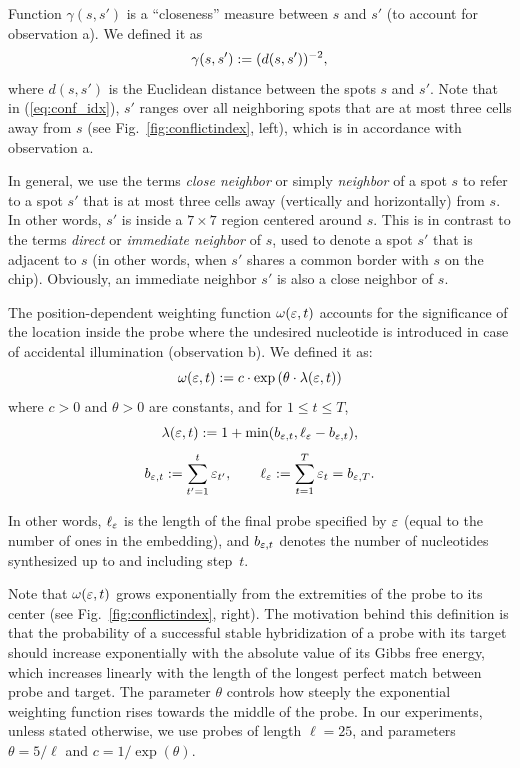 Function $\gamma(s,s')$ is a ``closeness'' measure between $s$ and $s'$ (to
account for observation a). We defined it as
\begin{equation}\label{eq:dist_weight}
\gamma(s,s') := (d(s,s'))^{-2},\nopagebreak
\end{equation}\nopagebreak
where $d(s,s')$ is the Euclidean distance between the spots $s$ and $s'$. Note
that in (\ref{eq:conf_idx}), $s'$ ranges over all neighboring spots that are at
most three cells away from $s$ (see Fig.~\ref{fig:conflictindex}, left), which is
in accordance with observation a.

In general, we use the terms \emph{close neighbor} or simply \emph{neighbor} of
a spot $s$ to refer to a spot $s'$ that is at most three cells away (vertically
and horizontally) from $s$. In other words, $s'$ is inside a $7\times 7$ region
centered around $s$. This is in contrast to the terms \emph{direct} or \emph{
immediate neighbor} of $s$, used to denote a spot $s'$ that is adjacent to $s$
(in other words, when $s'$ shares a common border with $s$ on the chip).
Obviously, an immediate neighbor $s'$ is also a close neighbor of $s$.

The position-dependent weighting function $\omega(\varepsilon,t)$ accounts for the
significance of the location inside the probe where the undesired nucleotide is
introduced in case of accidental illumination (observation b). We defined it as:
\begin{equation}\label{eq:pos_mult}
\omega(\varepsilon,t) := c \cdot \exp{\left(\theta \cdot \lambda(\varepsilon,t)\right)}
\end{equation}
where $c>0$ and $\theta>0$ are constants, and for $1\leq t\leq T$,
\begin{equation}\label{eq:base_pos}
  \lambda(\varepsilon,t) := 1 + \min(b_{\varepsilon,t},\ell_{\varepsilon} - b_{\varepsilon,t}),
\end{equation}
\begin{equation}\label{eq:b_ell}
  b_{\varepsilon,t} := \sum_{t'=1}^{t} \varepsilon_{t'},
  \qquad
  \ell_{\varepsilon} := \sum_{t=1}^{T} \varepsilon_t = b_{\varepsilon,T}.
\end{equation}

In other words, $\ell_\varepsilon$ is the length of the final probe specified by $\varepsilon$
(equal to the number of ones in the embedding), and $b_{\varepsilon,t}$ denotes the
number of nucleotides synthesized up to and including step~$t$.

Note that $\omega(\varepsilon,t)$ grows exponentially from the extremities of the probe
to its center (see Fig.~\ref{fig:conflictindex}, right). The motivation behind
this definition is that the probability of a successful stable hybridization of
a probe with its target should increase exponentially with the absolute value of
its Gibbs free energy, which increases linearly with the length of the longest
perfect match between probe and target. The parameter $\theta$ controls how
steeply the exponential weighting function rises towards the middle of the
probe. In our experiments, unless stated otherwise, we use probes of length
$\ell=25$, and parameters $\theta = 5/\ell$ and $c = 1/\exp{(\theta)}$.

